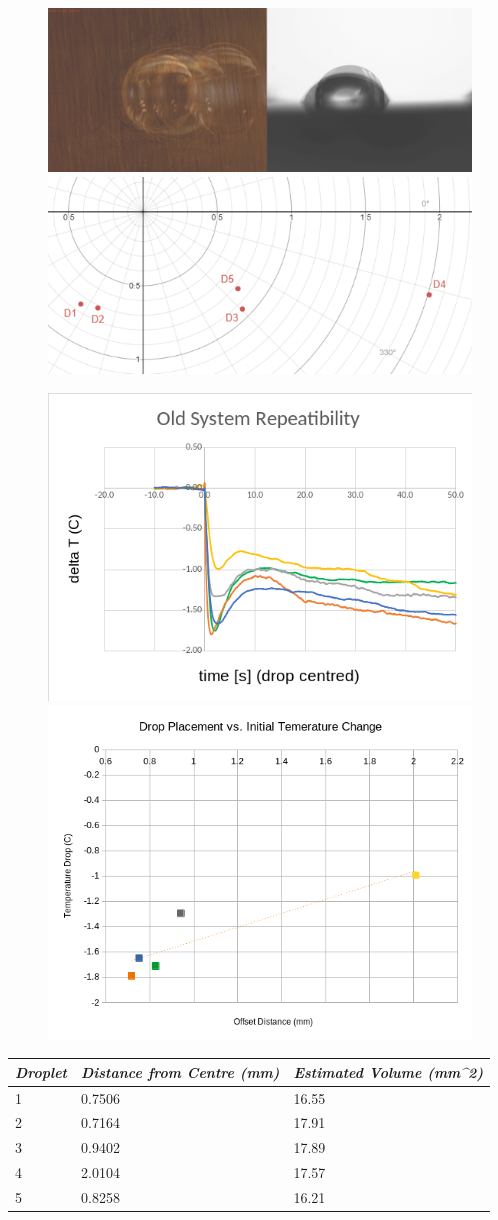 \begin{figure}[h]
    \begin{center}
        \includegraphics[width=.4\textwidth]{img/droplets_2018.png}
        \includegraphics[width=.4\textwidth]{img/drop_pos_2018.png}

        \includegraphics[width=.4\textwidth]{img/drop_temps_2018.png}
        \includegraphics[width=.4\textwidth]{img/2018_pos_temp_trend.png}
    \end{center}
\end{figure}

\begin{table}[h]
    \centering
    \begin{tabular}{|l|l|l|}
    \hline
    \textit{\textbf{Droplet}} & \textit{Distance from Centre (mm)} & \textit{Estimated Volume (mm\textasciicircum{}2)} \\ \hline
    \cellcolor[HTML]{9698ED}1 & 0.7506                             & 16.55                                             \\ \hline
    \cellcolor[HTML]{E9AD3F}2 & 0.7164                             & 17.91                                             \\ \hline
    \cellcolor[HTML]{C0C0C0}3 & 0.9402                             & 17.89                                             \\ \hline
    \cellcolor[HTML]{FFFC9E}4 & 2.0104                             & 17.57                                             \\ \hline
    \cellcolor[HTML]{79CD5D}5 & 0.8258                             & 16.21                                             \\ \hline
    \end{tabular}
    \end{table}

